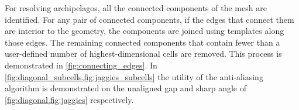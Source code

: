 
For resolving archipelagos, all the connected components of the mesh are identified.
For any pair of connected components, if the edges that connect them are interior to the geometry, the components are joined using templates along those edges.
The remaining connected components that contain fewer than a user-defined number of highest-dimensional cells are removed.
This process is demonstrated in \cref{fig:connecting_edges}. %
In \cref{fig:diagonal_subcells,fig:jaggies_subcells} the utility of the anti-aliasing algorithm is demonstrated on the unaligned gap and sharp angle of \cref{fig:diagonal,fig:jaggies} respectively.









